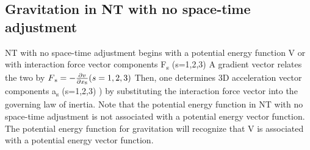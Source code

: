 \documentclass[12pt]{article}
\begin{document}
 \subsection{Gravitation in  NT with no space-time adjustment }
 NT with no space-time adjustment
begins with a potential energy function V or with interaction
force vector components F\textsubscript{s} (s=1,2,3)  A gradient vector
relates the two by $ F\textsubscript{s}=-\frac{\partial v}{\partial x\textsubscript{s}} (s=1,2,3)$
Then, one
determines 3D acceleration vector components a\textsubscript{s} (s=1,2,3)
) by substituting the interaction force vector into the governing law of inertia. Note that the potential energy function
in NT with no space-time adjustment is not associated with a
potential energy vector function. The potential energy function for gravitation will recognize that V is associated with a
potential energy vector function.
\end{document}
